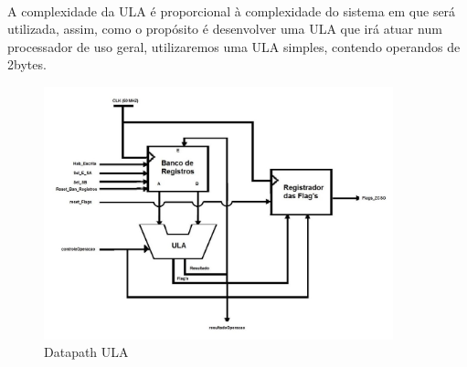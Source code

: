 \documentclass{report}
\begin{document}
    
\paragraph{}
    A complexidade da ULA é proporcional à complexidade do sistema em que será utilizada, assim, como o propósito é desenvolver uma ULA que irá atuar num processador de uso geral, utilizaremos uma ULA simples, contendo operandos de 2bytes.

\begin{figure}[H] \centering \includegraphics[width=0.9\textwidth]{datapathrs123.png}                \caption{Datapath ULA} \label{fig:mesh1} 
    \end{figure}
\end{document}
